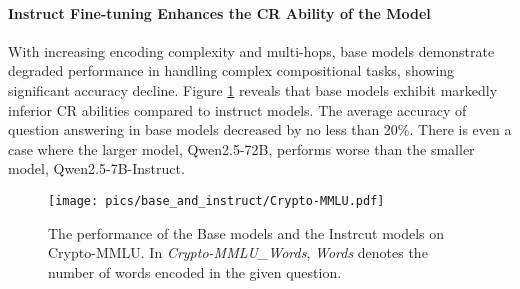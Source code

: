 \paragraph{Instruct Fine-tuning Enhances the CR Ability of the Model}
With increasing encoding complexity and multi-hops, base models demonstrate degraded performance in handling complex compositional tasks, showing significant accuracy decline. 
Figure \ref{fig:base} reveals that base models exhibit markedly inferior CR abilities compared to instruct models. The average accuracy of question answering in base models decreased by no less than 20\%.
There is even a case where the larger model, Qwen2.5-72B, performs worse than the smaller model, Qwen2.5-7B-Instruct.

\begin{figure}[h!]
    \centering
    \vskip 0.2in
    \texttt{[image: pics/base\_and\_instruct/Crypto-MMLU.pdf]}
    \caption{The performance of the Base models and the Instrcut models on Crypto-MMLU. In \textit{Crypto-MMLU\_Words}, \textit{Words} denotes the number of words encoded in the given question.}
    \label{fig:base}
    \vskip -0.2in
\end{figure}
